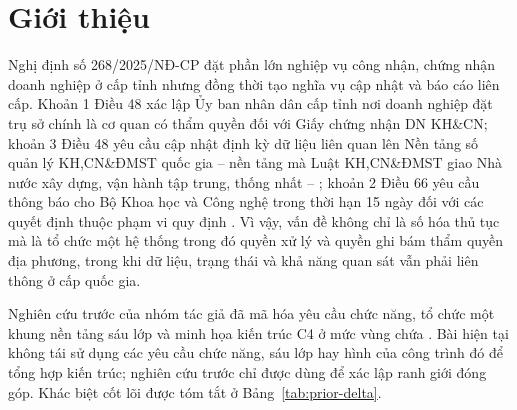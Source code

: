 \section{Giới thiệu}
\label{sec:intro}

Nghị định số 268/2025/NĐ-CP \citep{nd268_2025} đặt phần lớn nghiệp vụ công nhận, chứng nhận doanh nghiệp ở cấp tỉnh nhưng đồng thời tạo nghĩa vụ cập nhật và báo cáo liên cấp. Khoản 1 Điều 48 xác lập Ủy ban nhân dân cấp tỉnh nơi doanh nghiệp đặt trụ sở chính là cơ quan có thẩm quyền đối với Giấy chứng nhận DN KH\&CN; khoản 3 Điều 48 yêu cầu cập nhật định kỳ dữ liệu liên quan lên Nền tảng số quản lý KH,CN\&ĐMST quốc gia -- nền tảng mà Luật KH,CN\&ĐMST giao Nhà nước xây dựng, vận hành tập trung, thống nhất \citep[khoản 3 Điều 20]{luatkhcndmst2025} -- ; khoản 2 Điều 66 yêu cầu thông báo cho Bộ Khoa học và Công nghệ trong thời hạn 15 ngày đối với các quyết định thuộc phạm vi quy định \citep{nd268_2025}. Vì vậy, vấn đề không chỉ là số hóa thủ tục mà là tổ chức một hệ thống trong đó quyền xử lý và quyền ghi bám thẩm quyền địa phương, trong khi dữ liệu, trạng thái và khả năng quan sát vẫn phải liên thông ở cấp quốc gia.

Nghiên cứu trước của nhóm tác giả đã mã hóa yêu cầu chức năng, tổ chức một khung nền tảng sáu lớp và minh họa kiến trúc C4 ở mức vùng chứa \citep[pp.~54, 58--59]{nhom_bai1}. Bài hiện tại không tái sử dụng các yêu cầu chức năng, sáu lớp hay hình của công trình đó để tổng hợp kiến trúc; nghiên cứu trước chỉ được dùng để xác lập ranh giới đóng góp. Khác biệt cốt lõi được tóm tắt ở Bảng~\ref{tab:prior-delta}.

